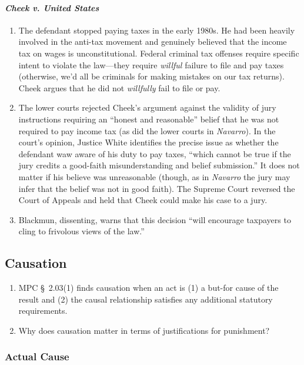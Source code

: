 \paragraph{\emph{Cheek v. United States}}

\begin{enumerate}
    \item The defendant stopped paying taxes in the early 1980s. He had been heavily involved in the anti-tax movement and genuinely believed that the income tax on wages is unconstitutional. Federal criminal tax offenses require specific intent to violate the law---they require \emph{willful} failure to file and pay taxes (otherwise, we'd all be criminals for making mistakes on our tax returns). Cheek argues that he did not \emph{willfully} fail to file or pay.
    \item The lower courts rejected Cheek's argument against the validity of jury instructions requiring an ``honest and reasonable'' belief that he was not required to pay income tax (as did the lower courts in \emph{Navarro}). In the court's opinion, Justice White identifies the precise issue as whether the defendant waw aware of his duty to pay taxes, ``which cannot be true if the jury credits a good-faith misunderstanding and belief submission.'' It does not matter if his believe was unreasonable (though, as in \emph{Navarro} the jury may infer that the belief was not in good faith). The Supreme Court reversed the Court of Appeals and held that Cheek could make his case to a jury.
    \item Blackmun, dissenting, warns that this decision ``will encourage taxpayers to cling to frivolous views of the law.''
\end{enumerate}

\subsection{Causation}

\begin{enumerate}
    \item MPC § 2.03(1) finds causation when an act is (1) a but-for cause of the result and (2) the causal relationship satisfies any additional statutory requirements.%
    \item Why does causation matter in terms of justifications for punishment?
\end{enumerate}

\subsubsection{Actual Cause}

